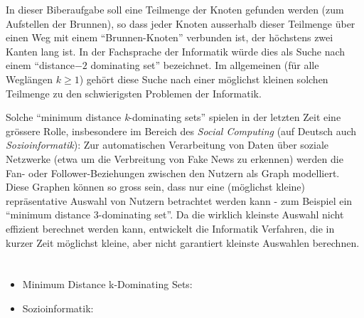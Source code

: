 {{In dieser Biberaufgabe soll eine Teilmenge der Knoten gefunden werden (zum Aufstellen der Brunnen), so dass jeder Knoten ausserhalb dieser Teilmenge über einen Weg mit einem \enquote{Brunnen-Knoten} verbunden ist, der höchstens zwei Kanten lang ist.  In der Fachsprache der Informatik würde dies als Suche nach einem \enquote{distance$-2$ dominating set} bezeichnet. Im allgemeinen (für alle Weglängen ${k \geq 1}$) gehört diese Suche nach einer möglichst kleinen solchen Teilmenge zu den schwierigsten Problemen der Informatik.

Solche \enquote{minimum distance \emph{k}-dominating sets} spielen in der letzten Zeit eine grössere Rolle, insbesondere im Bereich des \emph{Social Computing} (auf Deutsch auch \emph{Sozioinformatik}):
Zur automatischen Verarbeitung von Daten über soziale Netzwerke (etwa um die Verbreitung von Fake News zu erkennen)
werden die Fan- oder Follower-Beziehungen zwischen den Nutzern als Graph modelliert.
Diese Graphen können so gross sein, dass nur eine (möglichst kleine) repräsentative Auswahl von Nutzern betrachtet werden kann - zum Beispiel ein \enquote{minimum distance 3-dominating set}.
Da die wirklich kleinste Auswahl nicht effizient berechnet werden kann, entwickelt die Informatik Verfahren,
die in kurzer Zeit möglichst kleine, aber nicht garantiert kleinste Auswahlen berechnen.



\section*{\BrochureWebsitesAndKeywords}
{\raggedright
\begin{itemize}
  \item Minimum Distance k-Dominating Sets: \href{https://computationalsocialnetworks.springeropen.com/articles/10.1186/s40649-020-00078-5}{}
  \item Sozioinformatik: \href{https://de.wikipedia.org/wiki/Sozioinformatik}{}
\end{itemize}


}

}{}

\def\AuthorBarichelloL{} %
\def\AuthorNataliaN{} %
\def\AuthorLunaC{} %
\def\AuthorAlbaradeiS{} %
\def\AuthorPohlW{} %
\def\AuthorDatzkoThutS{} %

\newpage}{}
